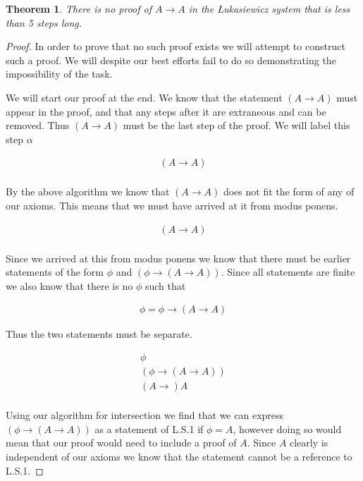 \documentclass{article}
\newtheorem{thm}{Theorem}
\begin{document}
\begin{thm}
There is no proof of $A \rightarrow A$ in the \L ukasiewicz system that is less than 5 steps long.
\end{thm}
\begin{proof}
In order to prove that no such proof exists we will attempt to construct such a proof.
We will despite our best efforts fail to do so demonstrating the impossibility of the task.

We will start our proof at the end.
We know that the statement $(A \rightarrow A)$ must appear in the proof,
and that any steps after it are extraneous and can be removed.
Thus $(A \rightarrow A)$ must be the last step of the proof.
We will label this step $\alpha$

\begin{align*}
(A \rightarrow A) \tag*{($\alpha$)}\\
\end{align*}

By the above algorithm we know that $(A \rightarrow A)$ does not fit the form of any of our axioms.
This means that we must have arrived at it from modus ponens.

\begin{align*}
(A \rightarrow A) \tag*{Modus Ponens ($\alpha$)}\\
\end{align*}

Since we arrived at this from modus ponens we know that there must be earlier statements of the form $\phi$ and $(\phi \rightarrow (A \rightarrow A))$.
Since all statements are finite we also know that there is no $\phi$ such that

\begin{align*}
\phi = \phi \rightarrow (A \rightarrow A)
\end{align*}

Thus the two statements must be separate.

\begin{gather*}
\phi \tag{$\gamma$}\\
(\phi \rightarrow (A \rightarrow A)) \tag{$\beta$}\\
(A \rightarrow) A \tag*{Modus Ponens ($\gamma$,$\beta$) ($\alpha$)}\\
\end{gather*}

Using our algorithm for intersection we find that we can express $(\phi \rightarrow (A \rightarrow A))$ as a statement of L.S.1 if $\phi = A$,
however doing so would mean that our proof would need to include a proof of $A$.
Since $A$ clearly is independent of our axioms we know that the statement cannot be a reference to L.S.1.


\end{proof}
\end{document}
